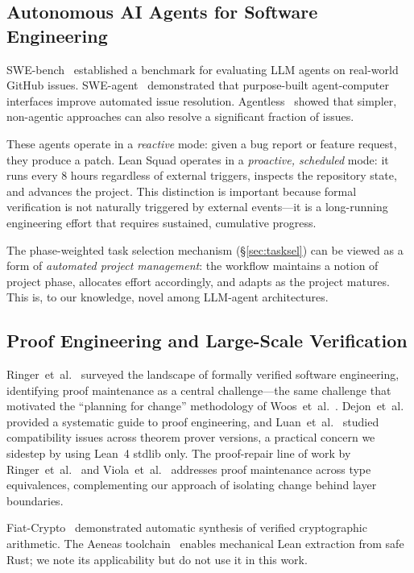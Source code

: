 \documentclass[sigconf,10pt]{acmart}
\begin{document}
\subsection{Autonomous AI Agents for Software Engineering}

SWE-bench~\cite{jimenez2024swebench} established a benchmark for
evaluating LLM agents on real-world GitHub issues.
SWE-agent~\cite{yang2024sweagent} demonstrated that purpose-built
agent-computer interfaces improve automated issue resolution.
Agentless~\cite{xia2024agentless} showed that simpler, non-agentic
approaches can also resolve a significant fraction of issues.

These agents operate in a \emph{reactive} mode: given a bug report or
feature request, they produce a patch.  Lean Squad operates in a
\emph{proactive, scheduled} mode: it runs every 8 hours regardless
of external triggers, inspects the repository state, and advances
the project.  This distinction is important because formal
verification is not naturally triggered by external events---it is
a long-running engineering effort that requires sustained, cumulative
progress.

The phase-weighted task selection mechanism (\S\ref{sec:tasksel})
can be viewed as a form of \emph{automated project management}:
the workflow maintains a notion of project phase, allocates effort
accordingly, and adapts as the project matures.  This is, to our
knowledge, novel among LLM-agent architectures.

\subsection{Proof Engineering and Large-Scale Verification}

Ringer~et~al.~\cite{ringer2019qed} surveyed the landscape of
formally verified software engineering, identifying proof maintenance
as a central challenge---the same challenge that motivated the
``planning for change'' methodology of Woos~et~al.~\cite{vard}.
Dejon~et~al.~\cite{dejon2024codetoqed} provided a systematic guide
to proof engineering, and Luan~et~al.~\cite{luan2025compatibility}
studied compatibility issues across theorem prover versions, a
practical concern we sidestep by using Lean~4 stdlib only.
The proof-repair line of work by
Ringer~et~al.~\cite{ringer2021repair} and
Viola~et~al.~\cite{viola2025repair} addresses proof maintenance
across type equivalences, complementing our approach of isolating
change behind layer boundaries.

Fiat-Crypto~\cite{fiat-crypto} demonstrated automatic synthesis of
verified cryptographic arithmetic.  The Aeneas
toolchain~\cite{aeneas,charon} enables mechanical Lean extraction
from safe Rust; we note its applicability but do not use it in this
work.
\end{document}
